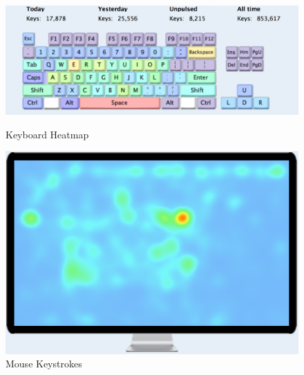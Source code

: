 \documentclass{article}
\begin{document}
\begin{figure}[ht]
	\vskip 0.2in
	\begin{center}
		\centerline{\includegraphics[width=\columnwidth]{keyboard}}
		\label{keyboard}
		\caption{Keyboard Heatmap}

		\label{icml-historical}
	\end{center}
	\vskip -0.2in
\end{figure} 

\begin{figure}[ht]
	\vskip 0.2in
	\begin{center}
		\centerline{\includegraphics[width=\columnwidth]{mouse_movement}}
		\caption{Mouse Keystrokes
		}
		\label{icml-historical}
	\end{center}
	\vskip -0.2in
\end{figure} 
\end{document}
